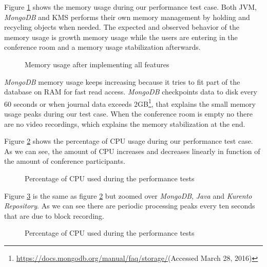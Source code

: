Figure \ref{fig:test_full_features_mem} shows the memory usage during our performance test case. Both \ac{JVM}, \emph{MongoDB} and \ac{KMS} performs their own memory management by holding and recycling objects when needed. The expected and observed behavior of the memory usage is growth memory usage while the users are entering in the conference room and a memory usage stabilization afterwards.


\begin{figure}[!htb]
  \begin{center}
    
  \end{center}
  \caption{Memory usage after implementing all features}
  \label{fig:test_full_features_mem}
\end{figure}

\emph{MongoDB} memory usage keeps increasing because it tries to fit part of the database on \ac{RAM} for fast read access. \emph{MongoDB} checkpoints data to disk every 60 seconds or when journal data exceeds 2GB\footnote{\url{https://docs.mongodb.org/manual/faq/storage/}(Accessed March 28, 2016)}, that explains the small memory usage peaks during our test case. When the conference room is empty no there are no video recordings, which explains the memory stabilization at the end.

Figure \ref{fig:test_full_features_cpu} shows the percentage of \ac{CPU} usage during our performance test case. As we can see, the amount of \ac{CPU} increases and decreases linearly in function of the amount of conference participants. 

\begin{figure}[!htb]
  \begin{center}
    
  \end{center}
  \caption{Percentage of CPU used during the performance tests}
  \label{fig:test_full_features_cpu}
\end{figure}

Figure \ref{fig:test_full_features_cpu_zoom} is the same as figure \ref{fig:test_full_features_cpu} but zoomed over \emph{MongoDB}, \emph{Java} and \emph{Kurento Repository}. As we can see there are periodic processing peaks every ten seconds that are due to block recording. 

\begin{figure}[!htb]
  \begin{center}
    
  \end{center}
  \caption{Percentage of CPU used during the performance tests}
  \label{fig:test_full_features_cpu_zoom}
\end{figure}

